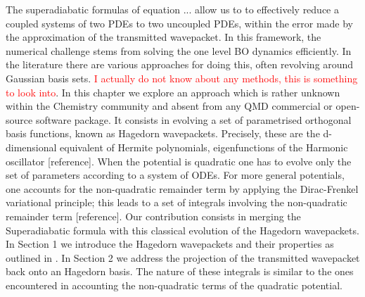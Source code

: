 \usepackage{amsmath}
\newtheorem{theorem}{Theorem}[section]
\newtheorem{corollary}{Corollary}[theorem]
\newtheorem{lemma}[theorem]{Lemma}


The superadiabatic formulas of equation  ... allow us to to effectively reduce a 
coupled systems of two PDEs to two uncoupled PDEs, within the error made by the approximation 
of the transmitted wavepacket. In this framework, the numerical challenge 
stems from solving the one level BO dynamics efficiently. 
In the literature there are various approaches for doing this, often revolving around 
Gaussian basis sets. \textcolor{red}{I actually do not know about any methods, this 
is something to look into}.
In this chapter we explore an approach which is rather unknown within the Chemistry community 
and absent from any QMD commercial or open-source software package. 
It consists in evolving a set of parametrised orthogonal basis functions, known as Hagedorn wavepackets. 
Precisely, these are the d-dimensional equivalent of Hermite polynomials, eigenfunctions of 
the Harmonic oscillator [reference].
When the potential is quadratic one has to evolve only the set of parameters according to 
a system of ODEs. 
For more general potentials, one accounts for the non-quadratic remainder term 
by applying the Dirac-Frenkel variational principle; this leads to a set of integrals 
involving the non-quadratic remainder term [reference].  
Our contribution consists in merging the Superadiabatic formula with 
this classical evolution of the Hagedorn wavepackets. 
In Section 1 we introduce the Hagedorn wavepackets and their properties as 
outlined in \cite{hagedornRaisingLoweringOperators1998}. In Section 2 
we address the projection of the transmitted wavepacket back onto an 
Hagedorn basis. The nature of these integrals is similar to the ones 
encountered in accounting the non-quadratic terms of the quadratic potential.

